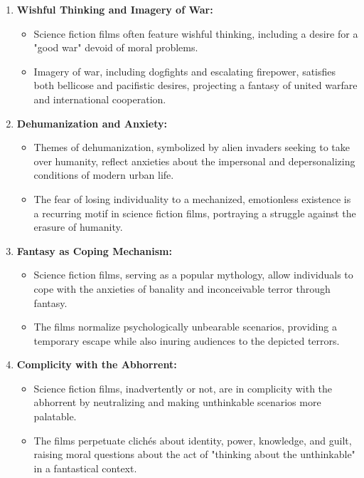 \documentclass[11pt,fleqn]{book} %
\begin{document}
\begin{enumerate}[label=\arabic*.]
\item \textbf{Wishful Thinking and Imagery of War:}
\begin{itemize}
    \item Science fiction films often feature wishful thinking, including a desire for a "good war" devoid of moral problems.
    \item Imagery of war, including dogfights and escalating firepower, satisfies both bellicose and pacifistic desires, projecting a fantasy of united warfare and international cooperation.
\end{itemize}

\item \textbf{Dehumanization and Anxiety:}
\begin{itemize}
    \item Themes of dehumanization, symbolized by alien invaders seeking to take over humanity, reflect anxieties about the impersonal and depersonalizing conditions of modern urban life.
    \item The fear of losing individuality to a mechanized, emotionless existence is a recurring motif in science fiction films, portraying a struggle against the erasure of humanity.
\end{itemize}

\item \textbf{Fantasy as Coping Mechanism:}
\begin{itemize}
    \item Science fiction films, serving as a popular mythology, allow individuals to cope with the anxieties of banality and inconceivable terror through fantasy.
    \item The films normalize psychologically unbearable scenarios, providing a temporary escape while also inuring audiences to the depicted terrors.
\end{itemize}

\item \textbf{Complicity with the Abhorrent:}
\begin{itemize}
    \item Science fiction films, inadvertently or not, are in complicity with the abhorrent by neutralizing and making unthinkable scenarios more palatable.
    \item The films perpetuate clichés about identity, power, knowledge, and guilt, raising moral questions about the act of "thinking about the unthinkable" in a fantastical context.
\end{itemize}
\end{enumerate}
\end{document}

